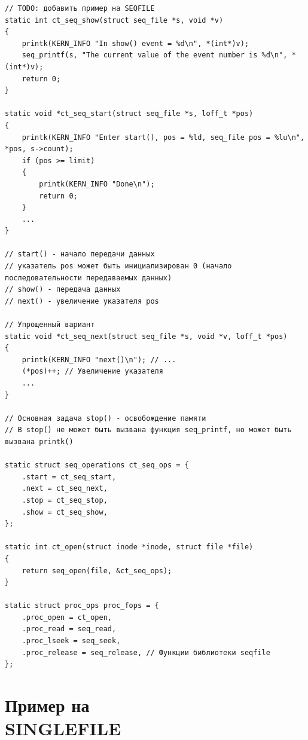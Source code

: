 \begin{lstlisting}
// TODO: добавить пример на SEQFILE
static int ct_seq_show(struct seq_file *s, void *v)
{
    printk(KERN_INFO "In show() event = %d\n", *(int*)v);
    seq_printf(s, "The current value of the event number is %d\n", *(int*)v);
    return 0;
}

static void *ct_seq_start(struct seq_file *s, loff_t *pos)
{
    printk(KERN_INFO "Enter start(), pos = %ld, seq_file pos = %lu\n", *pos, s->count);
    if (pos >= limit)
    {
        printk(KERN_INFO "Done\n");
        return 0;
    }
    ...
}

// start() - начало передачи данных
// указатель pos может быть инициализирован 0 (начало последовательности передаваемых данных)
// show() - передача данных
// next() - увеличение указателя pos

// Упрощенный вариант
static void *ct_seq_next(struct seq_file *s, void *v, loff_t *pos)
{
    printk(KERN_INFO "next()\n"); // ...
    (*pos)++; // Увеличение указателя
    ...
}

// Основная задача stop() - освобождение памяти
// В stop() не может быть вызвана функция seq_printf, но может быть вызвана printk()
                   
static struct seq_operations ct_seq_ops = {
    .start = ct_seq_start,
    .next = ct_seq_next,
    .stop = ct_seq_stop,
    .show = ct_seq_show,
};

static int ct_open(struct inode *inode, struct file *file)
{
    return seq_open(file, &ct_seq_ops);
}

static struct proc_ops proc_fops = {
    .proc_open = ct_open,
    .proc_read = seq_read,
    .proc_lseek = seq_seek,
    .proc_release = seq_release, // Функции библиотеки seqfile
};
\end{lstlisting}

\section{Пример на  \\ SINGLEFILE}

